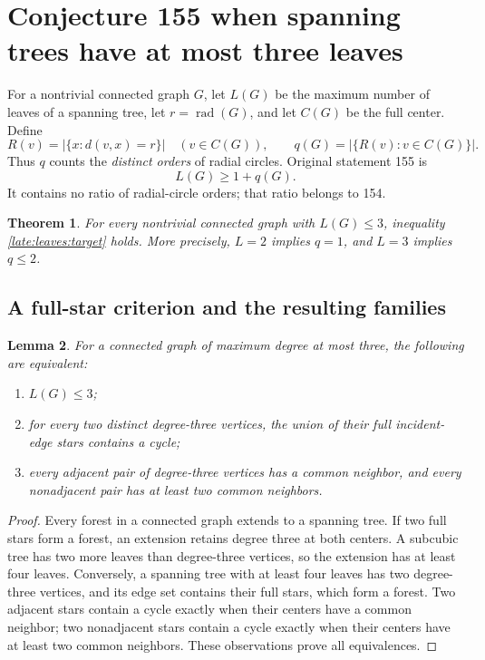 \documentclass[11pt,a4paper]{article}
\newtheorem{theorem}{Theorem}[section]
\newtheorem{lemma}[theorem]{Lemma}
\theoremstyle{definition}\newtheorem{definition}[theorem]{Definition}
\theoremstyle{remark}\newtheorem{remark}[theorem]{Remark}
\newcommand{\rad}{\operatorname{rad}}
\begin{document}
\section{Conjecture 155 when spanning trees have at most three leaves}\label{late:leaves}

For a nontrivial connected graph $G$, let $L(G)$ be the maximum number of
leaves of a spanning tree, let $r=\rad(G)$, and let $C(G)$ be the full
center. Define
\[
 R(v)=|\{x:d(v,x)=r\}|\quad(v\in C(G)),\qquad
 q(G)=|\{R(v):v\in C(G)\}|.
\]
Thus $q$ counts the \emph{distinct orders} of radial circles. Original
statement 155 is
\begin{equation}\label{late:leaves:target}
 L(G)\ge1+q(G).
\end{equation}
It contains no ratio of radial-circle orders; that ratio belongs to 154.

\begin{theorem}\label{late:leaves:main}
For every nontrivial connected graph with $L(G)\le3$, inequality
\eqref{late:leaves:target} holds. More precisely, $L=2$ implies $q=1$,
and $L=3$ implies $q\le2$.
\end{theorem}

\subsection{A full-star criterion and the resulting families}
\begin{lemma}\label{late:leaves:stars}
For a connected graph of maximum degree at most three, the following
are equivalent:
\begin{enumerate}
\item $L(G)\le3$;
\item for every two distinct degree-three vertices, the union of their
full incident-edge stars contains a cycle;
\item every adjacent pair of degree-three vertices has a common neighbor,
and every nonadjacent pair has at least two common neighbors.
\end{enumerate}
\end{lemma}
\begin{proof}
Every forest in a connected graph extends to a spanning tree. If two full
stars form a forest, an extension retains degree three at both centers.
A subcubic tree has two more leaves than degree-three vertices, so the
extension has at least four leaves. Conversely, a spanning tree with at
least four leaves has two degree-three vertices, and its edge set contains
their full stars, which form a forest. Two adjacent stars contain a cycle
exactly when their centers have a common neighbor; two nonadjacent stars
contain a cycle exactly when their centers have at least two common
neighbors. These observations prove all equivalences.
\end{proof}
\end{document}
